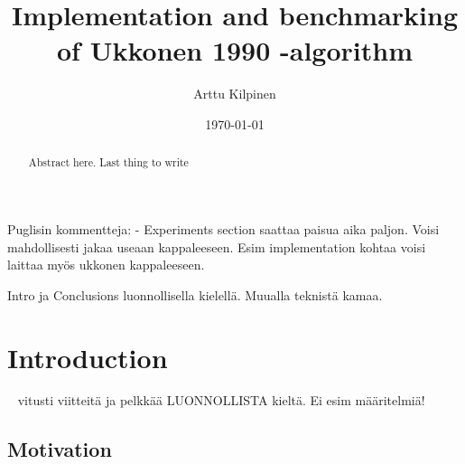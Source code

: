 \documentclass[english,twoside,censored,csm,algorithms-track-2020]{HYthesisML}
\title{Implementation and benchmarking of Ukkonen 1990 -algorithm}
\author{Arttu Kilpinen}
\date{\today}
\theoremstyle{plain}
\theoremstyle{definition}
\begin{document}
\maketitle



\begin{abstract}

  Abstract here. Last thing to write

\end{abstract}

\newpage
\mytableofcontents
\mainmatter


%
%
%
%


Puglisin kommentteja:
- Experiments section saattaa paisua aika paljon. Voisi mahdollisesti jakaa useaan kappaleeseen. Esim implementation kohtaa voisi laittaa myös ukkonen kappaleeseen.

Intro ja Conclusions luonnollisella kielellä. Muualla teknistä kamaa.

\chapter{Introduction}~\label{chp-intro}
  vitusti viitteitä ja pelkkää LUONNOLLISTA kieltä. Ei esim määritelmiä!

  \section{Motivation}
\end{document}
